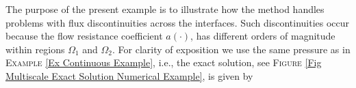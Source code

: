 \documentclass[3p]{elsarticle}
\begin{document}
\begin{example}\label{Ex Multiscale Continuous Example}
The purpose of the present example is to illustrate how the method handles problems with flux discontinuities across the interfaces. Such discontinuities occur because the flow resistance coefficient $ a(\cdot) $, has different orders of magnitude within regions $ \Omega_{1} $ and $ \Omega_{2} $. 
For clarity of exposition we use the same pressure as in \textsc{Example} \ref{Ex Continuous Example}, i.e., the exact solution, see \textsc{Figure} \ref{Fig Multiscale Exact Solution Numerical Example}, is given by
%
\begin{subequations}\label{Eqn Mult Cont Exact Solutions}


\end{subequations}
\end{example}
\end{document}
